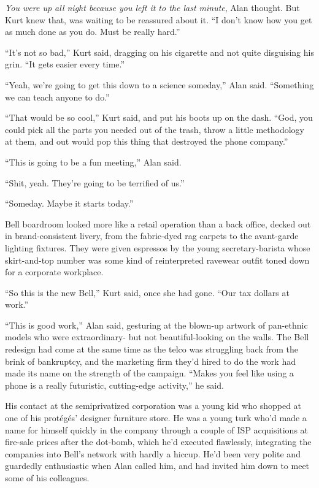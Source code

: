 \textit{You were up all night because you left it to the last minute},
Alan thought.  But Kurt knew that, was waiting to be reassured about
it.  ``I don't know how you get as much done as you do.  Must be
really hard.''

``It's not so bad,'' Kurt said, dragging on his cigarette and not
quite disguising his grin.  ``It gets easier every time.''

``Yeah, we're going to get this down to a science someday,'' Alan
said.  ``Something we can teach anyone to do.''

``That would be so cool,'' Kurt said, and put his boots up on the
dash.  ``God, you could pick all the parts you needed out of the
trash, throw a little methodology at them, and out would pop this
thing that destroyed the phone company.''

``This is going to be a fun meeting,'' Alan said.

``Shit, yeah.  They're going to be terrified of us.''

``Someday.  Maybe it starts today.''

 Bell boardroom looked more like a retail operation than a back
office, decked out in brand-consistent livery, from the fabric-dyed
rag carpets to the avant-garde lighting fixtures.  They were given
espressos by the young secretary-barista whose skirt-and-top number
was some kind of reinterpreted ravewear outfit toned down for a
corporate workplace.

``So this is the new Bell,'' Kurt said, once she had gone.  ``Our tax
dollars at work.''

``This is good work,'' Alan said, gesturing at the blown-up artwork of
pan-ethnic models who were extraordinary- but not beautiful-looking on
the walls.  The Bell redesign had come at the same time as the telco
was struggling back from the brink of bankruptcy, and the marketing
firm they'd hired to do the work had made its name on the strength of
the campaign.  ``Makes you feel like using a phone is a really
futuristic, cutting-edge activity,'' he said.

His contact at the semiprivatized corporation was a young kid who
shopped at one of his prot\'{e}g\'{e}s' designer furniture store.  He
was a young turk who'd made a name for himself quickly in the company
through a couple of ISP acquisitions at fire-sale prices after the
dot-bomb, which he'd executed flawlessly, integrating the companies
into Bell's network with hardly a hiccup.  He'd been very polite and
guardedly enthusiastic when Alan called him, and had invited him down
to meet some of his colleagues.

